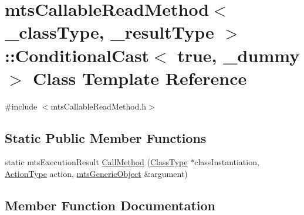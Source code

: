 \hypertarget{classmts_callable_read_method_1_1_conditional_cast_3_01true_00_01__dummy_01_4}{}\section{mts\+Callable\+Read\+Method$<$ \+\_\+class\+Type, \+\_\+result\+Type $>$\+:\+:Conditional\+Cast$<$ true, \+\_\+dummy $>$ Class Template Reference}
\label{classmts_callable_read_method_1_1_conditional_cast_3_01true_00_01__dummy_01_4}


{\ttfamily \#include $<$mts\+Callable\+Read\+Method.\+h$>$}

\subsection*{Static Public Member Functions}
\begin{DoxyCompactItemize}
\item 
static mts\+Execution\+Result \hyperlink{classmts_callable_read_method_1_1_conditional_cast_3_01true_00_01__dummy_01_4_a8b9d29573fa000d56b43efd541744ca9}{Call\+Method} (\hyperlink{classmts_callable_read_method_a44650138085a29d60a4f3cb3616abbbf}{Class\+Type} $\ast$class\+Instantiation, \hyperlink{classmts_callable_read_method_a9e05546d6f486e77f1df0c2b079dd7e1}{Action\+Type} action, \hyperlink{classmts_generic_object}{mts\+Generic\+Object} \&argument)
\end{DoxyCompactItemize}


\subsection{Member Function Documentation}
\hypertarget{classmts_callable_read_method_1_1_conditional_cast_3_01true_00_01__dummy_01_4_a8b9d29573fa000d56b43efd541744ca9}{}
